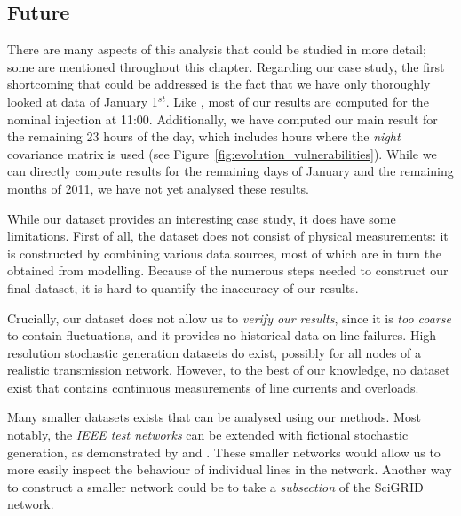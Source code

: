 \documentclass[main.tex]{subfiles}
\begin{document}
\subsection{Future}
There are many aspects of this analysis that could be studied in more detail; some are mentioned throughout this chapter. Regarding our case study, the first shortcoming that could be addressed is the fact that we have only thoroughly looked at data of January 1$^{st}$. Like \cite{Nesti2018emergentfailures}, most of our results are computed for the nominal injection at 11:00. Additionally, we have computed our main result for the remaining 23 hours of the day, which includes hours where the \emph{night} covariance matrix is used (see Figure~\ref{fig:evolution_vulnerabilities}). 
While we can directly compute results for the remaining days of January and the remaining months of 2011, we have not yet analysed these results.

While our dataset provides an interesting case study, it does have some limitations. First of all, the dataset does not consist of physical measurements: it is constructed by combining various data sources, most of which are in turn the obtained from modelling. Because of the numerous steps needed to construct our final dataset, it is hard to quantify the inaccuracy of our results. 

Crucially, our dataset does not allow us to \emph{verify our results}, since it is \emph{too coarse} to contain fluctuations, and it provides no historical data on line failures. High-resolution stochastic generation datasets do exist, possibly for all nodes of a realistic transmission network. However, to the best of our knowledge, no dataset exist that contains continuous measurements of line currents and overloads. 

Many smaller datasets exists that can be analysed using our methods. Most notably, the \emph{IEEE test networks} can be extended with fictional stochastic generation, as demonstrated by \cite{Nesti2018emergentfailures} and \cite{Chertkov2011}. These smaller networks would allow us to more easily inspect the behaviour of individual lines in the network. Another way to construct a smaller network could be to take a \emph{subsection} of the SciGRID network.

%
%
%
%
%
%
%
%
%
%

\clearpage
\end{document}
